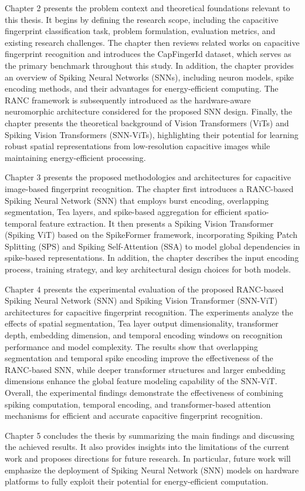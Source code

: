 \documentclass[../main.tex]{subfiles}
\begin{document}
Chapter 2 presents the problem context and theoretical foundations relevant to this thesis. 
It begins by defining the research scope, including the capacitive fingerprint classification task, problem formulation, evaluation metrics, and existing research challenges. 
The chapter then reviews related works on capacitive fingerprint recognition and introduces the CapFingerId dataset, which serves as the primary benchmark throughout this study. 
In addition, the chapter provides an overview of Spiking Neural Networks (SNNs), including neuron models, spike encoding methods, and their advantages for energy-efficient computing. 
The RANC framework is subsequently introduced as the hardware-aware neuromorphic architecture considered for the proposed SNN design. 
Finally, the chapter presents the theoretical background of Vision Transformers (ViTs) and Spiking Vision Transformers (SNN-ViTs), highlighting their potential for learning robust spatial representations from low-resolution capacitive images while maintaining energy-efficient processing.

Chapter 3 presents the proposed methodologies and architectures for capacitive image-based fingerprint recognition. 
The chapter first introduces a RANC-based Spiking Neural Network (SNN) that employs burst encoding, overlapping segmentation, Tea layers, and spike-based aggregation for efficient spatio-temporal feature extraction. 
It then presents a Spiking Vision Transformer (Spiking ViT) based on the SpikeFormer framework, incorporating Spiking Patch Splitting (SPS) and Spiking Self-Attention (SSA) to model global dependencies in spike-based representations. 
In addition, the chapter describes the input encoding process, training strategy, and key architectural design choices for both models.

Chapter 4 presents the experimental evaluation of the proposed RANC-based Spiking Neural Network (SNN) and Spiking Vision Transformer (SNN-ViT) architectures for capacitive fingerprint recognition. 
The experiments analyze the effects of spatial segmentation, Tea layer output dimensionality, transformer depth, embedding dimension, and temporal encoding windows on recognition performance and model complexity. 
The results show that overlapping segmentation and temporal spike encoding improve the effectiveness of the RANC-based SNN, while deeper transformer structures and larger embedding dimensions enhance the global feature modeling capability of the SNN-ViT. 
Overall, the experimental findings demonstrate the effectiveness of combining spiking computation, temporal encoding, and transformer-based attention mechanisms for efficient and accurate capacitive fingerprint recognition.

Chapter 5 concludes the thesis by summarizing the main findings and discussing the achieved results. 
It also provides insights into the limitations of the current work and proposes directions for future research. 
In particular, future work will emphasize the deployment of Spiking Neural Network (SNN) models on hardware platforms to fully exploit their potential for energy-efficient computation.
\end{document}
